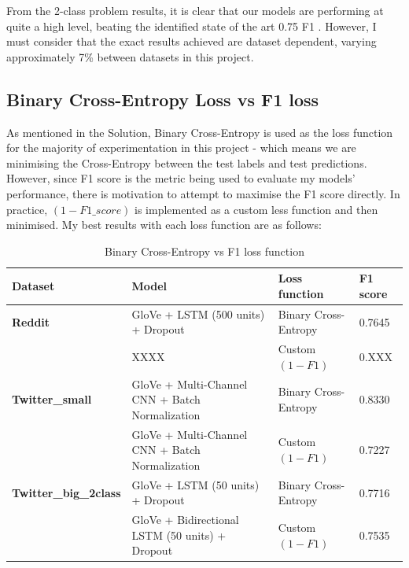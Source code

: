 \documentclass[12pt,a4paper]{article}
\begin{document}
From the 2-class problem results, it is clear that our models are performing at quite a high level, beating the identified state of the art 0.75 F1 \cite{Hack}. However, I must consider that the exact results achieved are dataset dependent, varying approximately 7\% between datasets in this project. 


\subsection{Binary Cross-Entropy Loss vs F1 loss}
As mentioned in the Solution, Binary Cross-Entropy is used as the loss function for the majority of experimentation in this project - which means we are minimising the Cross-Entropy between the test labels and test predictions. However, since F1 score is the metric being used to evaluate my models' performance, there is motivation to attempt to maximise the F1 score directly. In practice, $(1-F1\_score)$ is implemented as a custom less function and then minimised. My best results with each loss function are as follows:

\begin{table}[H]
	\centering
	\vspace*{-10pt}
	\caption{Binary Cross-Entropy vs F1 loss function}
	\label{F1Loss}
	\hspace*{-2.0cm}
	\begin{tabular}{p{3.2cm} p{9cm} p{3.9cm} p{1.7cm}} \hline\hline
		\textbf{Dataset} & \textbf{Model} & \textbf{Loss function} & \textbf{F1 score}  \\ \hline
		
		\textbf{Reddit} & GloVe + LSTM (500 units) + Dropout & Binary Cross-Entropy & 0.7645  \\
		& XXXX & Custom $(1-F1)$ & 0.XXX  \\ \hline
		
		\textbf{Twitter\_small} & GloVe + Multi-Channel CNN + Batch Normalization & Binary Cross-Entropy & 0.8330 \\
		& GloVe + Multi-Channel CNN + Batch Normalization & Custom $(1-F1)$ & 0.7227 \\ \hline
		
		\textbf{Twitter\_big\_2class} & GloVe + LSTM (50 units) + Dropout & Binary Cross-Entropy & 0.7716 \\
		& GloVe + Bidirectional LSTM (50 units) + Dropout & Custom $(1-F1)$ & 0.7535 \\ \hline
	\end{tabular}
\end{table}
\end{document}

